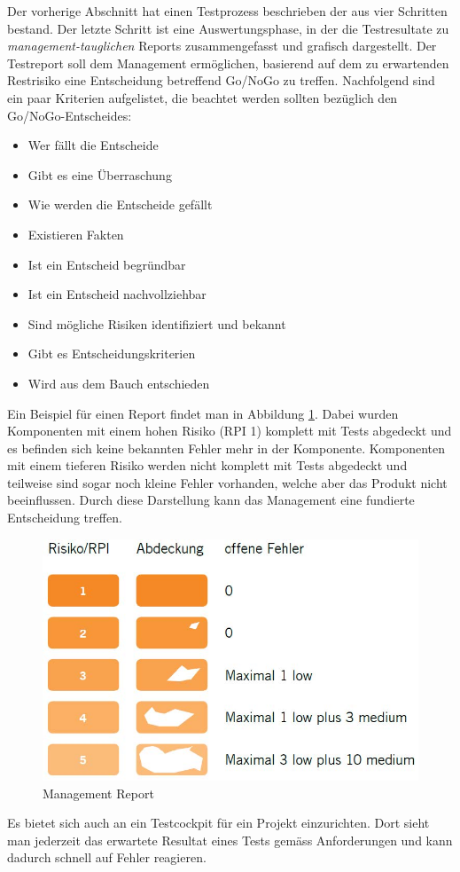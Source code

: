 Der vorherige Abschnitt hat einen Testprozess beschrieben der aus vier Schritten bestand. Der letzte Schritt ist eine Auswertungsphase, in der die Testresultate zu \textit{management-tauglichen} Reports zusammengefasst und grafisch dargestellt. Der Testreport soll dem Management ermöglichen, basierend auf dem zu erwartenden Restrisiko eine Entscheidung betreffend Go/NoGo zu treffen. Nachfolgend sind ein paar Kriterien aufgelistet, die beachtet werden sollten bezüglich den Go/NoGo-Entscheides:
\begin{itemize}
	\item Wer fällt die Entscheide
	\item Gibt es eine Überraschung
	\item Wie werden die Entscheide gefällt
	\item Existieren Fakten
	\item Ist ein Entscheid begründbar
	\item Ist ein Entscheid nachvollziehbar
	\item Sind mögliche Risiken identifiziert und bekannt
	\item Gibt es Entscheidungskriterien
	\item Wird aus dem Bauch entschieden
\end{itemize}
Ein Beispiel für einen Report findet man in Abbildung \ref{fig:go-nogo-report}. Dabei wurden Komponenten mit einem hohen Risiko (RPI 1) komplett mit Tests abgedeckt und es befinden sich keine bekannten Fehler mehr in der Komponente. Komponenten mit einem tieferen Risiko werden nicht komplett mit Tests abgedeckt und teilweise sind sogar noch kleine Fehler vorhanden, welche aber das Produkt nicht beeinflussen. Durch diese Darstellung kann das Management eine fundierte Entscheidung treffen.
\begin{figure}
\centering
\includegraphics[width=0.7\linewidth]{fig/go-nogo-report}
\caption{Management Report}
\label{fig:go-nogo-report}
\end{figure}
Es bietet sich auch an ein Testcockpit für ein Projekt einzurichten. Dort sieht man jederzeit das erwartete Resultat eines Tests gemäss Anforderungen und kann dadurch schnell auf Fehler reagieren.

